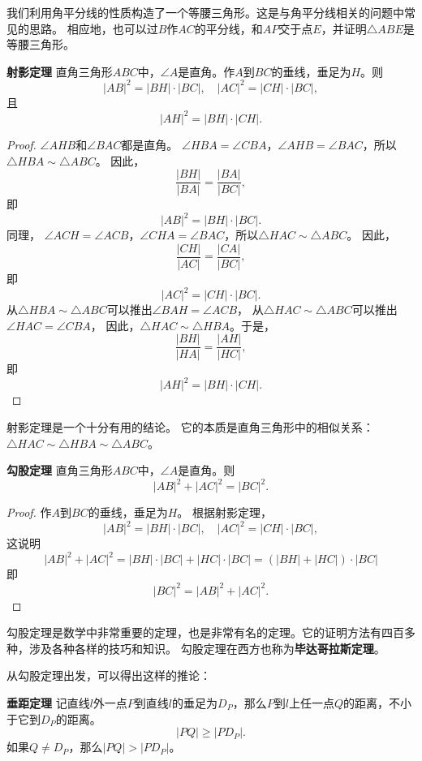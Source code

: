 \documentclass[12pt,UTF8]{ctexbook}
\begin{document}
我们利用角平分线的性质构造了一个等腰三角形。这是与角平分线相关的问题中常见的思路。
相应地，也可以过$B$作$AC$的平分线，和$AP$交于点$E$，并证明$\triangle ABE$是等腰三角形。

\begin{tm}{\textbf{射影定理}}\label{tm:0-2-2}
    直角三角形$ABC$中，$\angle A$是直角。作$A$到$BC$的垂线，垂足为$H$。则
    $$ |AB|^2 = |BH|\cdot |BC|, \quad |AC|^2 = |CH|\cdot |BC|,$$
    且
    $$|AH|^2 = |BH| \cdot |CH|.$$
\end{tm}
\begin{proof}
    $\angle AHB$和$\angle BAC$都是直角。
    $\angle HBA = \angle CBA$，$\angle AHB = \angle BAC$，所以$\triangle HBA \sim \triangle ABC$。
    因此，
    $$ \frac{|BH|}{|BA|} = \frac{|BA|}{|BC|},$$
    即
    $$ |AB|^2 = |BH|\cdot |BC|.$$
    同理，
    $\angle ACH = \angle ACB$，$\angle CHA = \angle BAC$，所以$\triangle HAC \sim \triangle ABC$。
    因此，
    $$ \frac{|CH|}{|AC|} = \frac{|CA|}{|BC|},$$
    即
    $$ |AC|^2 = |CH|\cdot |BC|.$$
    从$\triangle HBA \sim \triangle ABC$可以推出$\angle BAH = \angle ACB$，
    从$\triangle HAC \sim \triangle ABC$可以推出$\angle HAC = \angle CBA$，
    因此，$\triangle HAC \sim \triangle HBA$。于是，
    $$ \frac{|BH|}{|HA|} = \frac{|AH|}{|HC|},$$
    即
    $$|AH|^2 = |BH| \cdot |CH|.$$
\end{proof}

射影定理是一个十分有用的结论。
它的本质是直角三角形中的相似关系：$\triangle HAC \sim \triangle HBA \sim \triangle ABC$。

\begin{tm}{\textbf{勾股定理}}\label{tm:0-2-3}
    直角三角形$ABC$中，$\angle A$是直角。则
    $$|AB|^2+|AC|^2 = |BC|^2.$$
\end{tm}
\begin{proof}
    作$A$到$BC$的垂线，垂足为$H$。
    根据射影定理，    
    $$ |AB|^2 = |BH|\cdot |BC|, \quad |AC|^2 = |CH|\cdot |BC|,$$
    这说明
    $$ |AB|^2+|AC|^2 = |BH|\cdot |BC| + |HC|\cdot |BC| = (|BH| + |HC|)\cdot |BC|$$
    即
    $$ |BC|^2 = |AB|^2+|AC|^2.$$
\end{proof}

勾股定理是数学中非常重要的定理，也是非常有名的定理。它的证明方法有四百多种，涉及各种各样的技巧和知识。
勾股定理在西方也称为\textbf{毕达哥拉斯定理}。

从勾股定理出发，可以得出这样的推论：
\begin{cor}{\textbf{垂距定理}}\label{cr:0-2-0}
    记直线$l$外一点$P$到直线$l$的垂足为$D_P$，那么$P$到$l$上任一点$Q$的距离，不小于它到$D_P$的距离。
    $$ |PQ | \geqslant |PD_P|.$$
    如果$Q \neq D_P$，那么$|PQ| > |PD_P|$。
\end{cor}
\end{document}
